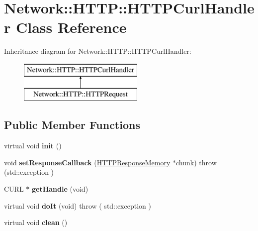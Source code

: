 \hypertarget{classNetwork_1_1HTTP_1_1HTTPCurlHandler}{}\section{Network\+:\+:H\+T\+TP\+:\+:H\+T\+T\+P\+Curl\+Handler Class Reference}
\label{classNetwork_1_1HTTP_1_1HTTPCurlHandler}
Inheritance diagram for Network\+:\+:H\+T\+TP\+:\+:H\+T\+T\+P\+Curl\+Handler\+:\begin{figure}[H]
\begin{center}
\leavevmode
\includegraphics[height=2.000000cm]{dd/d92/classNetwork_1_1HTTP_1_1HTTPCurlHandler}
\end{center}
\end{figure}
\subsection*{Public Member Functions}
\begin{DoxyCompactItemize}
\item 
\mbox{\label{classNetwork_1_1HTTP_1_1HTTPCurlHandler_a92de1090a6631a63369f956387d0627a}} 
virtual void {\bfseries init} ()
\item 
\mbox{\label{classNetwork_1_1HTTP_1_1HTTPCurlHandler_a8a8acaf3560d2b0ecf5b2533a749e465}} 
void {\bfseries set\+Response\+Callback} (\hyperlink{structNetwork_1_1HTTP_1_1HTTPResponseMemory}{H\+T\+T\+P\+Response\+Memory} $\ast$chunk)  throw (std\+::exception )
\item 
\mbox{\label{classNetwork_1_1HTTP_1_1HTTPCurlHandler_a09626294d8ba90d5d365200c44dda471}} 
C\+U\+RL $\ast$ {\bfseries get\+Handle} (void)
\item 
\mbox{\label{classNetwork_1_1HTTP_1_1HTTPCurlHandler_a4fcf7e210a14f48aca958e295a2055dd}} 
virtual void {\bfseries do\+It} (void)  throw ( std\+::exception )
\item 
\mbox{\label{classNetwork_1_1HTTP_1_1HTTPCurlHandler_aa6ad1edac5930e5161d6154c8b812e3f}} 
virtual void {\bfseries clean} ()
\end{DoxyCompactItemize}
